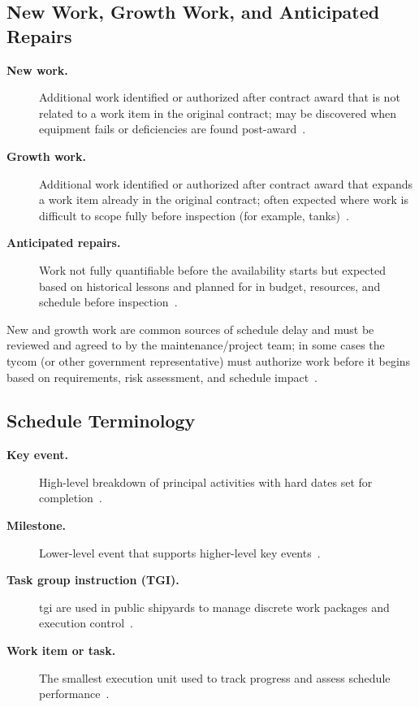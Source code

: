 \documentclass[../main.tex]{subfiles}
\begin{document}
\subsection{New Work, Growth Work, and Anticipated Repairs}
\begin{description}
  \item[\textbf{New work.}] Additional work identified or authorized after contract award that is not related to a work item in the original contract; may be discovered when equipment fails or deficiencies are found post-award~\autocite{edo-4-2-2-cno-availability-execution-2025}.
  \item[\textbf{Growth work.}] Additional work identified or authorized after contract award that expands a work item already in the original contract; often expected where work is difficult to scope fully before inspection (for example, tanks)~\autocite{edo-4-2-2-cno-availability-execution-2025}.
  \item[\textbf{Anticipated repairs.}] Work not fully quantifiable before the availability starts but expected based on historical lessons and planned for in budget, resources, and schedule before inspection~\autocite{edo-4-2-2-cno-availability-execution-2025}.
\end{description}
New and growth work are common sources of schedule delay and must be reviewed and agreed to by the maintenance/project team; in some cases the \ac{tycom} (or other government representative) must authorize work before it begins based on requirements, risk assessment, and schedule impact~\autocite{edo-4-2-2-cno-availability-execution-2025}.

\subsection{Schedule Terminology}
\begin{description}
  \item[\textbf{Key event.}] High-level breakdown of principal activities with hard dates set for completion~\autocite{edo-4-2-2-cno-availability-execution-2025}.
  \item[\textbf{Milestone.}] Lower-level event that supports higher-level key events~\autocite{edo-4-2-2-cno-availability-execution-2025}.
  \item[\textbf{Task group instruction (TGI).}] \ac{tgi} are used in public shipyards to manage discrete work packages and execution control~\autocite{edo-4-2-2-cno-availability-execution-2025}.
  \item[\textbf{Work item or task.}] The smallest execution unit used to track progress and assess schedule performance~\autocite{edo-4-2-2-cno-availability-execution-2025}.
\end{description}
\end{document}
